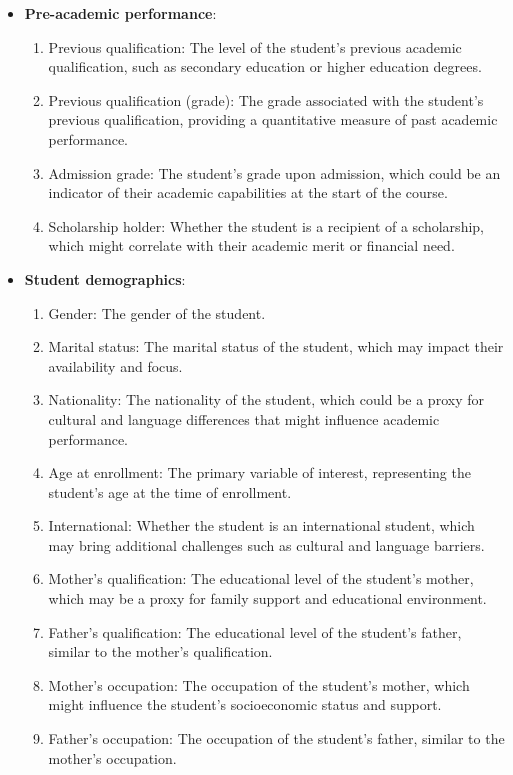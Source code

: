 \documentclass[12pt]{article}
\begin{document}
\begin{itemize}
    \item \textbf{Pre-academic performance}:
          \begin{enumerate}
              \item Previous qualification: The level of the student's previous academic qualification, such as secondary education or higher education degrees.
              \item Previous qualification (grade): The grade associated with the student's previous qualification, providing a quantitative measure of past academic performance.
              \item Admission grade: The student's grade upon admission, which could be an indicator of their academic capabilities at the start of the course.
              \item Scholarship holder: Whether the student is a recipient of a scholarship, which might correlate with their academic merit or financial need.
          \end{enumerate}

    \item \textbf{Student demographics}:
          \begin{enumerate}
              \item Gender: The gender of the student.
              \item Marital status: The marital status of the student, which may impact their availability and focus.
              \item Nationality: The nationality of the student, which could be a proxy for cultural and language differences that might influence academic performance.
              \item Age at enrollment: The primary variable of interest, representing the student's age at the time of enrollment.
              \item International: Whether the student is an international student, which may bring additional challenges such as cultural and language barriers.
              \item Mother's qualification: The educational level of the student's mother, which may be a proxy for family support and educational environment.
              \item Father's qualification: The educational level of the student's father, similar to the mother's qualification.
              \item Mother's occupation: The occupation of the student's mother, which might influence the student's socioeconomic status and support.
              \item Father's occupation: The occupation of the student's father, similar to the mother's occupation.
          \end{enumerate}


\end{itemize}
\end{document}
